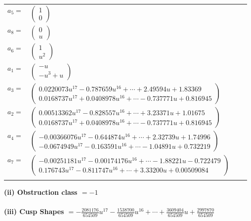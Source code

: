 \documentclass[1p]{elsarticle_modified}
\theoremstyle{definition}
\begin{document}
\begin{tabular}{m{7pt} m{180pt} m{7pt} m{180pt} }
\flushright $a_{5}=$&$\begin{pmatrix}1\\0\end{pmatrix}$ \\
\flushright $a_{8}=$&$\begin{pmatrix}0\\u\end{pmatrix}$ \\
\flushright $a_{6}=$&$\begin{pmatrix}1\\u^2\end{pmatrix}$ \\
\flushright $a_{1}=$&$\begin{pmatrix}- u\\- u^3+u\end{pmatrix}$ \\
\flushright $a_{3}=$&$\begin{pmatrix}0.0220073 u^{17}-0.787659 u^{16}+\cdots+2.49594 u+1.83369\\0.0168737 u^{17}+0.0408978 u^{16}+\cdots-0.737771 u+0.816945\end{pmatrix}$ \\
\flushright $a_{2}=$&$\begin{pmatrix}0.00513362 u^{17}-0.828557 u^{16}+\cdots+3.23371 u+1.01675\\0.0168737 u^{17}+0.0408978 u^{16}+\cdots-0.737771 u+0.816945\end{pmatrix}$ \\
\flushright $a_{4}=$&$\begin{pmatrix}-0.00366076 u^{17}-0.644874 u^{16}+\cdots+2.32739 u+1.74996\\-0.0674949 u^{17}-0.163591 u^{16}+\cdots-1.04891 u+0.732219\end{pmatrix}$ \\
\flushright $a_{7}=$&$\begin{pmatrix}-0.00251181 u^{17}-0.00174176 u^{16}+\cdots-1.88221 u-0.722479\\0.176743 u^{17}-0.811747 u^{16}+\cdots+3.33200 u+0.00509084\end{pmatrix}$\\&\end{tabular}
\flushleft \textbf{(ii) Obstruction class $= -1$}\\~\\
\flushleft \textbf{(iii) Cusp Shapes $= -\frac{2081176}{654509} u^{17}-\frac{1538700}{654509} u^{16}+\cdots+\frac{3609404}{654509} u+\frac{2997870}{654509}$}\\~\\
\end{document}
